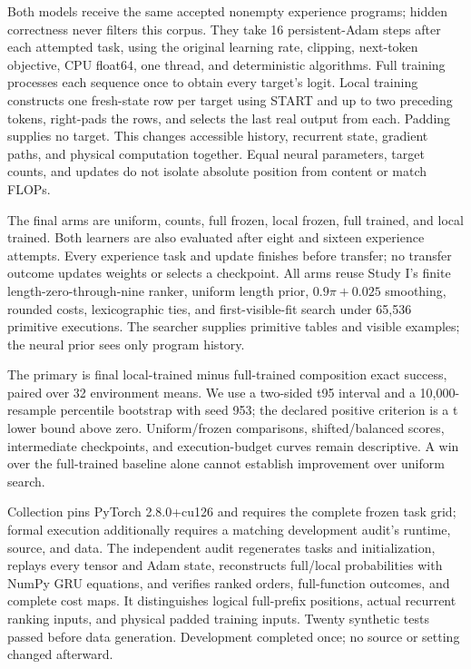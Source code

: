 \documentclass[11pt]{article}
\begin{document}
Both models receive the same accepted nonempty experience programs; hidden
correctness never filters this corpus. They take 16 persistent-Adam steps
after each attempted task, using the original learning rate, clipping, next-token objective,
CPU float64, one thread, and deterministic algorithms. Full training processes
each sequence once to obtain every target's logit. Local training constructs
one fresh-state row per target using START and up to two preceding tokens,
right-pads the rows, and selects the last real output from each. Padding
supplies no target. This changes accessible history, recurrent state,
gradient paths, and physical computation together. Equal neural parameters,
target counts, and updates do not isolate absolute position from content or
match FLOPs.

The final arms are uniform, counts, full frozen, local frozen, full trained,
and local trained. Both learners are also evaluated after eight and sixteen
experience attempts. Every experience task and update finishes before transfer;
no transfer outcome updates weights or selects a checkpoint. All arms reuse
Study I's finite length-zero-through-nine ranker, uniform length prior,
$0.9\pi+0.025$ smoothing, rounded costs, lexicographic ties, and first-visible-fit
search under 65,536 primitive executions. The searcher supplies primitive
tables and visible examples; the neural prior sees only program history.

The primary is final local-trained minus full-trained composition exact
success, paired over 32 environment means. We use a two-sided t95 interval
and a 10,000-resample percentile bootstrap with seed 953; the declared
positive criterion is a t lower bound above zero. Uniform/frozen comparisons,
shifted/balanced scores, intermediate checkpoints, and execution-budget
curves remain descriptive. A win over the full-trained baseline alone cannot
establish improvement over uniform search.

Collection pins PyTorch 2.8.0+cu126 and requires the complete frozen task grid;
formal execution additionally requires a matching development audit's runtime,
source, and data. The independent audit regenerates tasks and initialization,
replays every tensor and Adam state, reconstructs full/local probabilities
with NumPy GRU equations, and verifies ranked orders, full-function outcomes,
and complete cost maps. It distinguishes logical full-prefix positions,
actual recurrent ranking inputs, and physical padded training inputs.
Twenty synthetic tests passed before data generation. Development completed
once; no source or setting changed afterward.
\end{document}
